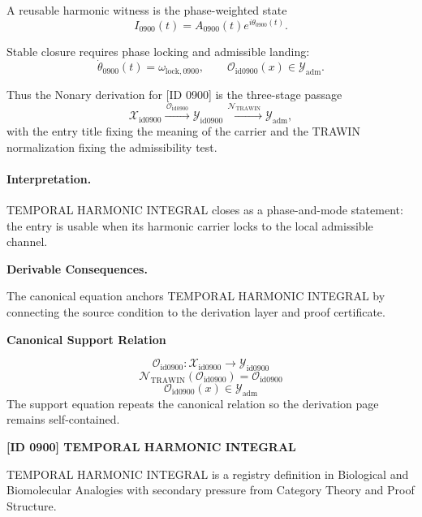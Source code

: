 A reusable harmonic witness is the phase-weighted state\[
I_{0900}(t)=A_{0900}(t)e^{i\theta_{0900}(t)}.
\]

Stable closure requires phase locking and admissible landing:\[
\dot{\theta}_{0900}(t)=\omega_{\mathrm{lock},0900},\qquad \mathcal{O}_{\mathrm{id0900}}(x)\in\mathcal{Y}_{\mathrm{adm}}.
\]

Thus the Nonary derivation for [ID 0900] is the three-stage passage
\[
\mathcal{X}_{\mathrm{id0900}}\xrightarrow{\,\mathcal{O}_{\mathrm{id0900}}\,} \mathcal{Y}_{\mathrm{id0900}}\xrightarrow{\,\mathcal{N}_{\mathrm{TRAWIN}}\,} \mathcal{Y}_{\mathrm{adm}},
\]
with the entry title fixing the meaning of the carrier and the TRAWIN normalization fixing the admissibility test.

\paragraph{Interpretation.} TEMPORAL HARMONIC INTEGRAL closes as a phase-and-mode statement: the entry is usable when its harmonic carrier locks to the local admissible channel.

\par\vspace{0.35em}
\noindent\textbf{Derivable Consequences.}\quad
\begingroup
\footnotesize
\raggedright
The canonical equation anchors TEMPORAL HARMONIC INTEGRAL by connecting the source condition to the derivation layer and proof certificate.
\par\endgroup

\noindent\textbf{Canonical Support Relation}\par
\[
\mathcal{O}_{\mathrm{id0900}}:\mathcal{X}_{\mathrm{id0900}}\longrightarrow\mathcal{Y}_{\mathrm{id0900}}
\]
\[
\mathcal{N}_{\mathrm{TRAWIN}}(\mathcal{O}_{\mathrm{id0900}})=\mathcal{O}_{\mathrm{id0900}}
\]
\[
\mathcal{O}_{\mathrm{id0900}}(x)\in\mathcal{Y}_{\mathrm{adm}}
\]
\noindent The support equation repeats the canonical relation so the derivation page remains self-contained.\par

\clearpage
\noindent\textbf{[ID 0900] TEMPORAL HARMONIC INTEGRAL}\par
\vspace{0.35em}
\begingroup\small
{}
TEMPORAL HARMONIC INTEGRAL is a registry definition in Biological and Biomolecular Analogies with secondary pressure from Category Theory and Proof Structure.

